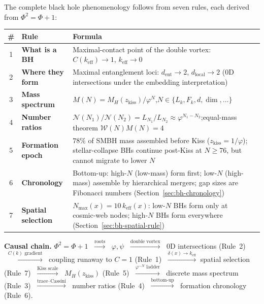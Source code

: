 \documentclass[12pt,a4paper]{article}
\begin{document}
The complete black hole phenomenology follows from seven rules, each derived from $\Phi^2 = \Phi + 1$:

\begin{center}\small
\begin{tabular}{|c|p{3.0cm}|p{5.0cm}|c|}
\hline
\# & \textbf{Rule} & \textbf{Formula} \\
\hline
1 & \textbf{What is a BH} & Maximal-contact point of the double vortex: $C(k_{\mathrm{eff}}) \to 1$, $k_{\mathrm{eff}} \to 0$ \\
\hline
2 & \textbf{Where they form} & Maximal entanglement loci: $d_{\mathrm{ent}} \to 2$, $d_{\mathrm{local}} \to 2$ (0D intersections under the embedding interpretation) \\
\hline
3 & \textbf{Mass spectrum} & $M(N) = M_H(z_{\mathrm{kiss}})/\varphi^N$,\newline $N \in \{L_k, F_k, d, \dim, \ldots\}$ \\
\hline
4 & \textbf{Number ratios} & $\mathcal{N}(N_1)/\mathcal{N}(N_2) = L_{N_1}/L_{N_2} \approx \varphi^{N_1-N_2}$;\newline equal-mass theorem $\mathcal{W}(N) M(N) = 4$ \\
\hline
5 & \textbf{Formation epoch} & $78\%$ of SMBH mass assembled before Kiss ($z_{\mathrm{kiss}} = 1/\varphi$); stellar-collapse BHs continue post-Kiss at $N \geq 76$, but cannot migrate to lower $N$ \\
\hline
6 & \textbf{Chronology} & Bottom-up: high-$N$ (low-mass) form first; low-$N$ (high-mass) assemble by hierarchical mergers; gap sizes are Fibonacci numbers (Section~\ref{sec:bh-chronology}) \\
\hline
7 & \textbf{Spatial selection} & $N_{\max}(x) = 10\,k_{\mathrm{eff}}(x)$: low-$N$ BHs form only at cosmic-web nodes; high-$N$ BHs form everywhere (Section~\ref{sec:bh-spatial-rule}) \\
\hline
\end{tabular}
\end{center}

\noindent\textbf{Causal chain.}\;
$\Phi^2 = \Phi + 1$
$\;\xrightarrow{\text{roots}}\;$ $\varphi, \psi$
$\;\xrightarrow{\text{double vortex}}\;$ 0D intersections (Rule~2)
$\;\xrightarrow{C(k)\text{ gradient}}\;$ coupling runaway to $C = 1$ (Rule~1)
$\;\xrightarrow{\delta(x) \to k_{\mathrm{eff}}}$ spatial selection (Rule~7)
$\;\xrightarrow{\text{Kiss scale}}\;$ $M_H(z_{\mathrm{kiss}})$ (Rule~5)
$\;\xrightarrow{\varphi^{-N}\text{ ladder}}\;$ discrete mass spectrum (Rule~3)
$\;\xrightarrow{\text{trace--Cassini}}\;$ number ratios (Rule~4)
$\;\xrightarrow{\text{bottom-up}}\;$ formation chronology (Rule~6).
\end{document}
